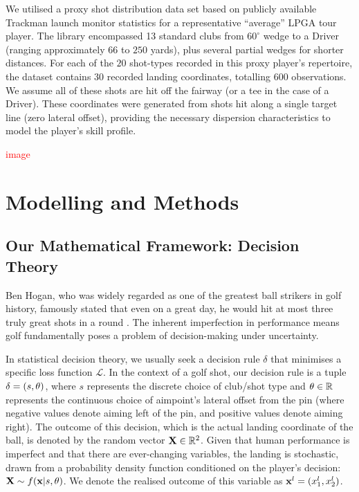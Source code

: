 \documentclass[11pt, letterpaper]{article}
\begin{document}
We utilised a proxy shot distribution data set based on publicly available Trackman launch monitor statistics for a representative ``average'' LPGA tour player. The library encompassed 13 standard clubs from $60^\circ$ wedge to a Driver (ranging approximately $66$ to $250$ yards), plus several partial wedges for shorter distances. For each of the $20$ shot-types recorded in this proxy player's repertoire, the dataset contains 30 recorded landing coordinates, totalling 600 observations. We assume all of these shots are hit off the fairway (or a tee in the case of a Driver). These coordinates were generated from shots hit along a single target line (zero lateral offset), providing the necessary dispersion characteristics to model the player's skill profile. 

\textcolor{red}{image}

\section{Modelling and Methods}
\label{sec:Modelling}

\subsection{Our Mathematical Framework: Decision Theory}

Ben Hogan, who was widely regarded as one of the greatest ball strikers in golf history, famously stated that even on a great day, he would hit at most three  truly great shots in a round \parencite{Jenkins_1998}. The inherent imperfection in performance means golf fundamentally poses a problem of decision-making under uncertainty.

In statistical decision theory, we usually seek a decision rule $\delta$ that minimises a specific loss function $\mathcal{L}$. In the context of a golf shot, our decision rule is a tuple $\delta = (s, \theta)$, where $s$ represents the discrete choice of club/shot type and $\theta \in \mathbb{R}$ represents the continuous choice of aimpoint's lateral offset from the pin (where negative values denote aiming left of the pin, and positive values denote aiming right). The outcome of this decision, which is the actual landing coordinate of the ball, is denoted by the random vector $\mathbf{X} \in \mathbb{R}^2$. Given that human performance is imperfect and that there are ever-changing variables, the landing is stochastic, drawn from a probability density function conditioned on the player's decision: $\mathbf{X} \sim f(\mathbf{x} | s, \theta) $. We denote the realised outcome of this variable as $\mathbf{x}^l = (x_1^l,x_2^l)$.
\end{document}
